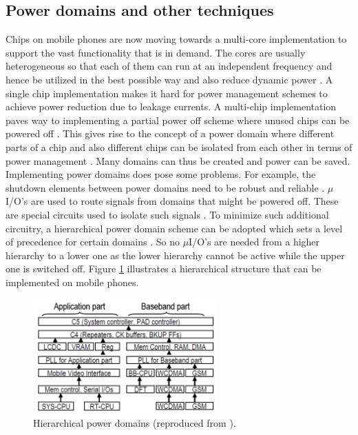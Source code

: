 \documentclass[journal]{IEEEtran}
\begin{document}
\subsection{Power domains and other techniques}
Chips on mobile phones are now moving towards a multi-core implementation to support the vast functionality that is in demand. The cores are usually heterogeneous so that each of them can run at an independent frequency and hence be utilized in the best possible way and also reduce dynamic power \cite{HierarchicalPower}. A single chip implementation makes it hard for power management schemes to achieve power reduction due to leakage currents. A multi-chip implementation paves way to implementing a partial power off scheme where unused chips can be powered off \cite{HierarchicalPower}. This gives rise to the concept of a power domain where different parts of a chip and also different chips can be isolated from each other in terms of power management \cite{HierarchicalPower}. Many domains can thus be created and power can be saved. Implementing power domains does pose some problems. For example, the shutdown elements between power domains need to be robust and reliable \cite{HierarchicalPower}. $\mu$I/O’s are used to route signals from domains that might be powered off. These are special circuits used to isolate such signals \cite{HierarchicalPower}. To minimize such additional circuitry, a hierarchical power domain scheme can be adopted which sets a level of precedence for certain domains \cite{HierarchicalPower}. So no $\mu$I/O’s are needed from a higher hierarchy to a lower one as the lower hierarchy cannot be active while the upper one is switched off. Figure \ref{Figure:Hier} illustrates a hierarchical structure that can be implemented on mobile phones.

	\begin{figure}[h]
	   \centering
	   \includegraphics[width = 7cm]{Hier}
	   \caption{Hierarchical power domains (reproduced from \cite{HierarchicalPower}).}
	   \label{Figure:Hier}
	\end{figure}	
	\FloatBarrier
\end{document}
